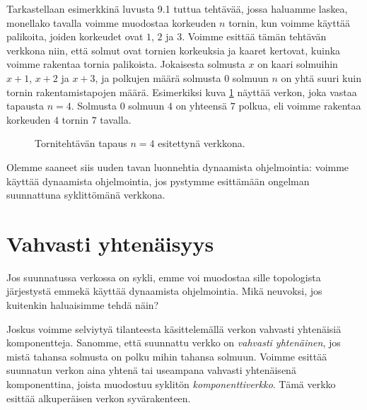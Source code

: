 Tarkastellaan esimerkkinä luvusta 9.1 tuttua tehtävää,
jossa haluamme laskea, monellako tavalla voimme muodostaa
korkeuden $n$ tornin, kun voimme käyttää palikoita,
joiden korkeudet ovat $1$, $2$ ja $3$.
Voimme esittää tämän tehtävän verkkona niin,
että solmut ovat tornien korkeuksia ja kaaret kertovat,
kuinka voimme rakentaa tornia palikoista.
Jokaisesta solmusta $x$ on kaari solmuihin
$x+1$, $x+2$ ja $x+3$,
ja polkujen määrä solmusta $0$ solmuun $n$
on yhtä suuri kuin tornin rakentamistapojen määrä.
Esimerkiksi kuva \ref{fig:verkol} näyttää verkon,
joka vastaa tapausta $n=4$.
Solmusta $0$ solmuun $4$ on yhteensä $7$ polkua,
eli voimme rakentaa korkeuden $4$ tornin $7$ tavalla.

\begin{figure}
\center
\begin{center}
\end{center}
\caption{Tornitehtävän tapaus $n=4$ esitettynä verkkona.}
\label{fig:verkol}
\end{figure}

Olemme saaneet siis uuden tavan luonnehtia dynaamista ohjelmointia:
voimme käyttää dynaamista ohjelmointia,
jos pystymme esittämään ongelman suunnattuna syklittömänä verkkona.

\section{Vahvasti yhtenäisyys}

Jos suunnatussa verkossa on sykli,
emme voi muodostaa sille topologista järjestystä
emmekä käyttää dynaamista ohjelmointia.
Mikä neuvoksi, jos kuitenkin haluaisimme tehdä näin?

Joskus voimme selviytyä tilanteesta käsittelemällä
verkon vahvasti yhtenäisiä komponentteja.
Sanomme, että suunnattu verkko on \emph{vahvasti yhtenäinen},
jos mistä tahansa solmusta on polku mihin tahansa solmuun.
Voimme esittää suunnatun verkon aina yhtenä tai
useampana vahvasti yhtenäisenä komponenttina,
joista muodostuu syklitön \emph{komponenttiverkko}.
Tämä verkko esittää alkuperäisen verkon syvärakenteen.

